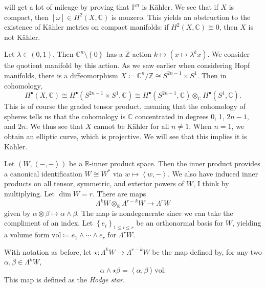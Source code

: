 
 will get a lot of mileage by proving that $\mathbb{P} ^n$ is K\"ahler. We see that if $X$ is compact, then $[\omega ]\in H^2(X,\mathbb{C} )$ is nonzero. This yields an obstruction to the existence of K\"ahler metrics on compact manifolds: if $H^2(X,\mathbb{C} )\cong 0$, then $X$ is not K\"ahler.

\begin{example}
	Let $\lambda \in(0,1)$. Then $\mathbb{C} ^n\setminus \left\{ 0 \right\} $ has a $\mathbb{Z} $-action $k\mapsto (x\mapsto \lambda ^kx)$. We consider the quotient manifold by this action. As we saw earlier when considering Hopf manifolds, there is a diffeomorphism $X\coloneqq \mathbb{C} ^n / \mathbb{Z} \cong S^{2n-1} \times S^1$. Then in cohomology,
	\[
		H^{\bullet} (X,\mathbb{C} ) \cong H^{\bullet} (S^{2n-1} \times S^1,\mathbb{C} )\cong H^{\bullet} (S^{2n-1} ,\mathbb{C} )\otimes _\mathbb{C} H^{\bullet} (S^1,\mathbb{C} )
	.\]
	This is of course the graded tensor product, meaning that the cohomology of spheres tells us that the cohomology is $\mathbb{C} $ concentrated in degrees 0, 1, $2n-1$, and $2n$. We thus see that $X$ cannot be K\"ahler for all $n\neq 1$. When $n=1$, we obtain an elliptic curve, which is projective. We will see that this implies it is K\"ahler.
\end{example}


Let $(W,\left\langle -,- \right\rangle )$ be a $\mathbb{R} $-inner product space. Then the inner product provides a canonical identification $W\cong W^*$ via $w\mapsto \left\langle w,- \right\rangle $. We also have induced inner products on all tensor, symmetric, and exterior powers of $W$, I think by multiplying. Let $\dim W = r$. There are maps
\[
	\Lambda ^kW \otimes _\mathbb{R} \Lambda ^{r-k} W \to \Lambda ^rW
\]
given by $\alpha \otimes \beta \mapsto \alpha \wedge \beta $. The map is nondegenerate since we can take the compliment of an index. Let $\left\{ e_i \right\}_{1\leq i\leq r} $ be an orthonormal basis for $W$, yielding a volume form $\mathrm{vol} \coloneqq e_1 \wedge \cdots \wedge e_r$ for $\Lambda ^rW$.


\begin{definition}\label{dfn:5.0.4}
	With notation as before, let $\star : \Lambda ^kW \to \Lambda ^{r-k} W$ be the map defined by, for any two $\alpha ,\beta \in \Lambda ^kW$,
	\[
		\alpha \wedge \star \beta = \left\langle \alpha ,\beta  \right\rangle \mathrm{vol} 
	.\]
	This map is defined as the \emph{Hodge star}.
\end{definition}

